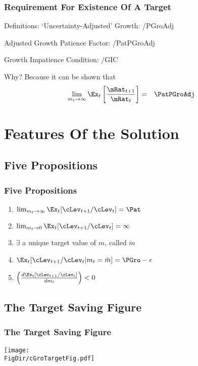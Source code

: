 \documentclass[pdflatex]{beamer}\providecommand{\texname}{BufferStockTheorySlides}%
\begin{document}
\begin{frame}
\frametitle{Requirement For Existence Of A Target}

Definitions: `Uncertainty-Adjusted' Growth:
 \EqDir/PGroAdj

Adjusted Growth Patience Factor:
 \EqDir/PatPGroAdj

Growth Impatience Condition:
 \EqDir/GIC

Why?  Because it can be shown that
\begin{eqnarray}
 \lim_{m_{t} \rightarrow \infty} \Ex_{t}\left[\frac{\mRat_{t+1}}{\mRat_{t}}\right] & = & \PatPGroAdj  \label{eq:mGrowth}
\end{eqnarray}

\end{frame}

\section{Features Of the Solution}
\subsection{Five Propositions}
\begin{frame}
\frametitle{Five Propositions}

\begin{enumerate}
\item $\lim_{m_{t} \rightarrow \infty} \Ex_{t}[\cLev_{t+1}/\cLev_{t}] = \Pat$
\item $\lim_{m_{t} \rightarrow 0} \Ex_{t}[\cLev_{t+1}/\cLev_{t}] = \infty$
\item $\exists$ a unique target value of $m$, called $\check{m}$
\item $\Ex_{t}[\cLev_{t+1}/\cLev_{t} | m_{t} = \check{m}] = \PGro - \epsilon$
\item $\left(\frac{d \Ex_{t}[\cLev_{t+1}/\cLev_{t}]}{d m_{t}}\right) < 0$
\end{enumerate}

\end{frame}

\subsection{The Target Saving Figure}
\begin{frame}
\frametitle{The Target Saving Figure}
\centerline{\texttt{[image: \\FigDir/cGroTargetFig.pdf]}}
\end{frame}
\end{document}
